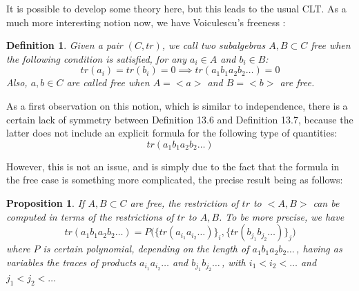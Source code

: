 \documentclass[12pt]{amsbook}
\newtheorem{definition}[theorem]{Definition}
\newtheorem{proposition}[theorem]{Proposition}
\begin{document}
It is possible to develop some theory here, but this leads to the usual CLT. As a much more interesting notion now, we have Voiculescu's freeness \cite{vo1}:


\begin{definition}
Given a pair $(C,tr)$, we call two subalgebras $A,B\subset C$ free when the following condition is satisfied, for any $a_i\in A$ and $b_i\in B$:
$$tr(a_i)=tr(b_i)=0\implies tr(a_1b_1a_2b_2\ldots)=0$$
Also, $a,b\in C$ are called free when $A=<a>$ and $B=<b>$ are free.
\end{definition}

As a first observation on this notion, which is similar to independence, there is a certain lack of symmetry between Definition 13.6 and Definition 13.7, because the latter does not include an explicit formula for the following type of quantities:
$$tr(a_1b_1a_2b_2\ldots)$$

However, this is not an issue, and is simply due to the fact that the formula in the free case is something more complicated, the precise result being as follows:


\begin{proposition}
If $A,B\subset C$ are free, the restriction of $tr$ to $<A,B>$ can be computed in terms of the restrictions of $tr$ to $A,B$. To be more precise, we have
$$tr(a_1b_1a_2b_2\ldots)=P\Big(\{tr(a_{i_1}a_{i_2}\ldots)\}_i,\{tr(b_{j_1}b_{j_2}\ldots)\}_j\Big)$$
where $P$ is certain polynomial, depending on the length of $a_1b_1a_2b_2\ldots\,$, having as variables the traces of products $a_{i_1}a_{i_2}\ldots$ and $b_{j_1}b_{j_2}\ldots\,$, with $i_1<i_2<\ldots$ and $j_1<j_2<\ldots$
\end{proposition}
\end{document}
